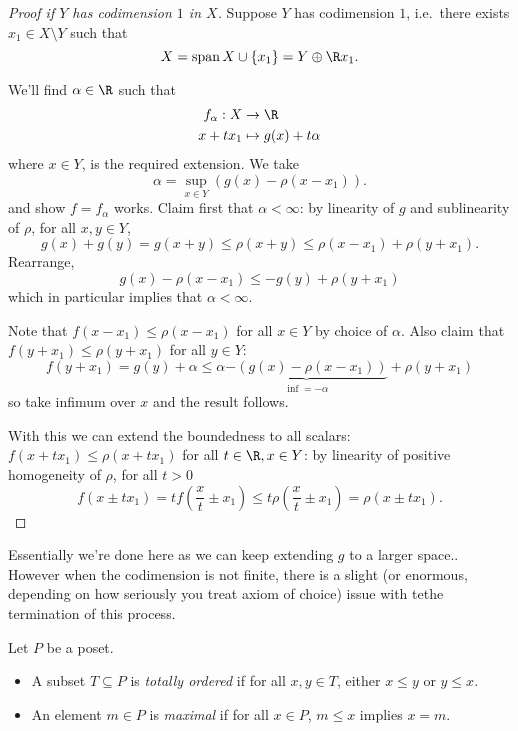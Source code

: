 \documentclass[a4paper]{article}
\DeclareMathOperator{\spans}{span} %
\begin{document}
\begin{proof}[Proof if \(Y\) has codimension \(1\) in \(X\)]
  Suppose \(Y\) has codimension \(1\), i.e.\ there exists \(x_1 \in X \setminus Y\) such that
  \[
    X = \spans X \cup \{x_1\} = Y \oplus \R x_1.
  \]

  We'll find \(\alpha \in \R\) such that
  \begin{align*}
    f_\alpha: X &\to \R \\
    x + tx_1 &\mapsto g(x) + t \alpha
  \end{align*}
  where \(x \in Y\), is the required extension. We take
  \[
    \alpha = \sup_{x \in Y} (g(x) - \rho(x - x_1)).
  \]
  and show \(f = f_\alpha\) works. Claim first that \(\alpha < \infty\): by linearity of \(g\) and sublinearity of \(\rho\), for all \(x, y \in Y\),
  \[
    g(x) + g(y) = g(x + y) \leq \rho(x + y) \leq \rho(x - x_1) + \rho(y + x_1).
  \]
  Rearrange,
  \[
    g(x) - \rho(x - x_1) \leq - g(y) + \rho(y + x_1)
  \]
  which in particular implies that \(\alpha < \infty\).

  Note that \(f(x - x_1) \leq \rho(x - x_1)\) for all \(x \in Y\) by choice of \(\alpha\). Also claim that \(f(y + x_1) \leq \rho(y + x_1)\) for all \(y \in Y\):
  \[
    f(y + x_1) = g(y) + \alpha \leq \alpha \underbrace{-(g(x) - \rho(x - x_1))}_{\inf = -\alpha} + \rho(y + x_1)
  \]
  so take infimum over \(x\) and the result follows.

  With this we can extend the boundedness to all scalars: \(f(x + tx_1) \leq \rho(x + tx_1)\) for all \(t \in \R, x \in Y\): by linearity of positive homogeneity of \(\rho\), for all \(t > 0\)
  \[
    f(x \pm tx_1) = tf(\frac{x}{t} \pm x_1) \leq t \rho( \frac{x}{t} \pm x_1) = \rho(x \pm tx_1).
  \]
\end{proof}

Essentially we're done here as we can keep extending \(g\) to a larger space.. However when the codimension is not finite, there is a slight (or enormous, depending on how seriously you treat axiom of choice) issue with tethe termination of this process.

\begin{definition}
  Let \(P\) be a poset.
  \begin{itemize}
  \item A subset \(T \subseteq P\) is \emph{totally ordered} if for all \(x, y \in T\), either \(x \leq y\) or \(y \leq x\).
  \item An element \(m \in P\) is \emph{maximal} if for all \(x \in P\), \(m \leq x\) implies \(x = m\).
  \end{itemize}
\end{definition}
\end{document}
